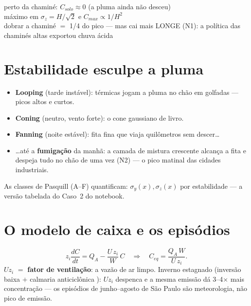 \documentclass[11pt]{article}
\begin{document}
\begin{noquadro}
perto da chaminé: $C_{solo} \approx 0$ (a pluma ainda não desceu)\\
máximo em $\sigma_z = H/\sqrt2$ \quad e \quad
$C_{max} \propto 1/H^2$\\[2pt]
dobrar a chaminé $=$ 1/4 do pico — mas cai mais LONGE (N1): a
política das chaminés altas exportou chuva ácida
\end{noquadro}

\section{Estabilidade esculpe a pluma}\label{sec:estab}


\begin{itemize}
  \item \textbf{Looping} (tarde instável): térmicas jogam a pluma no
        chão em golfadas — picos altos e curtos.
  \item \textbf{Coning} (neutro, vento forte): o cone gaussiano de
        livro.
  \item \textbf{Fanning} (noite estável): fita fina que viaja
        quilômetros sem descer\ldots
  \item \ldots até a \textbf{fumigação} da manhã: a camada de mistura
        crescente  alcança a fita e
        despeja tudo no chão de uma vez (N2) — o pico matinal das
        cidades industriais.
\end{itemize}

As classes de Pasquill (A--F) quantificam: $\sigma_y(x), \sigma_z(x)$
por estabilidade — a versão tabelada do Caso~2 do notebook.

\section{O modelo de caixa e os episódios}\label{sec:caixa}

\begin{formadif}
\[ z_i\frac{dC}{dt} = Q_A - \frac{U\,z_i}{W}\,C
\quad\Rightarrow\quad
C_{eq} = \frac{Q_A\,W}{U\,z_i}. \]
$U z_i$ $=$ \textbf{fator de ventilação}: a vazão de ar limpo. Inverno
estagnado (inversão baixa  $+$ calmaria
anticiclônica ): $Uz_i$ despenca e a
mesma emissão dá 3--4$\times$ mais concentração — os episódios de
junho--agosto de São Paulo são meteorologia, não pico de emissão.
\end{formadif}
\end{document}
